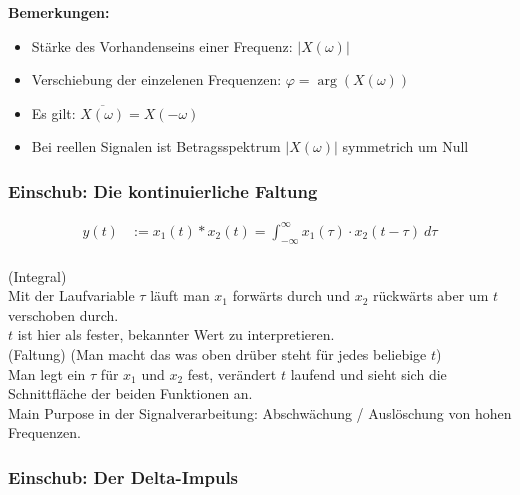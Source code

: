 \documentclass[12pt,a4paper]{scrartcl}
\begin{document}
    \noindent  \textbf{Bemerkungen:}
    \begin{itemize}
      \item Stärke des Vorhandenseins einer Frequenz: $|X(\omega)|$
      \item Verschiebung der einzelenen Frequenzen: $\varphi = \arg(X(\omega))$
      \item Es gilt: $\overline{X(\omega)} = X(-\omega)$
      \item Bei reellen Signalen ist Betragsspektrum $|X(\omega)|$ symmetrich um Null
    \end{itemize}

    \subsubsection{Einschub: Die kontinuierliche Faltung}
  \label{sec:sub:sub:faltung}

  \begin{equation}
    \label{eq:7}
      \begin{split}
      y(t) &:= x_1 (t) * x_2 (t) = \int_{-\infty}^{\infty} x_1 (\tau) \cdot x_2 (t-\tau)\ d \tau \\
      \end{split}
    \end{equation}
  
    \noindent (Integral)\\
    \noindent Mit der Laufvariable $\tau$ läuft man $x_1$ forwärts durch und $x_2$ rückwärts aber um $t$ verschoben durch. \\
    $t$ ist hier als fester, bekannter Wert zu interpretieren. \\

    \noindent(Faltung) (Man macht das was oben drüber steht für jedes beliebige $t$)\\
    \noindent Man legt ein $\tau$ für $x_1$ und $x_2$ fest, verändert $t$ laufend und sieht sich die Schnittfläche der beiden Funktionen an. \\

    \noindent Main Purpose in der Signalverarbeitung: Abschwächung / Auslöschung von hohen Frequenzen.

  \subsubsection{Einschub: Der Delta-Impuls}
  \label{sec:sub:sub:delta-impuls}
\end{document}
